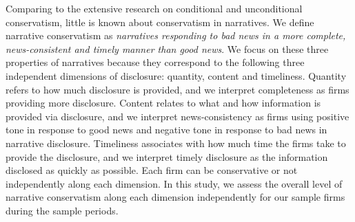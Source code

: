 \documentclass[a4paper]{article}
\begin{document}
\begin{spacing}{2}
Comparing to the extensive research on conditional and unconditional conservatism, little is known about conservatism in narratives. We define narrative conservatism as \textit{narratives responding to bad news in a more complete, news-consistent and timely manner than good news}. We focus on these three properties of narratives because they correspond to the following three independent dimensions of disclosure: quantity, content and timeliness. Quantity refers to how much disclosure is provided, and we interpret completeness as firms providing more disclosure. Content relates to what and how information is provided via disclosure, and we interpret news-consistency as firms using positive tone in response to good news and negative tone in response to bad news in narrative disclosure. Timeliness associates with how much time the firms take to provide the disclosure, and we interpret timely disclosure as the information disclosed as quickly as possible. Each firm can be conservative or not independently along each dimension. In this study, we assess the overall level of narrative conservatism along each dimension independently for our sample firms during the sample periods. 


\end{spacing}
\end{document}
